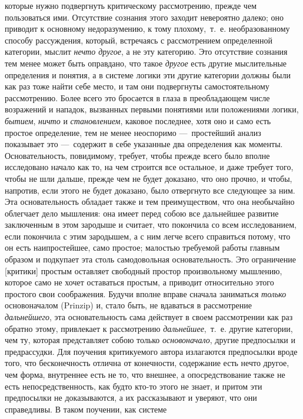 которые нужно подвергнуть критическому рассмотрению, прежде чем
пользоваться ими. Отсутствие сознания этого заходит невероятно далеко; оно
приводит к основному недоразумению, к тому плохому,~т.~е. необразованному
способу рассуждения, который, встречаясь с рассмотрением определенной
категории, мыслит {\em нечто другое}, а не эту
категорию. Это отсутствие сознания тем менее может быть оправдано, что
такое {\em другое} есть другие мыслительные определения
и понятия, а в системе логики эти другие категории должны были как раз тоже
найти себе место, и там они подвергнуты самостоятельному рассмотрению.
Более всего это бросается в глаза в преобладающем числе возражений и
нападок, вызванных первыми понятиями или положениями логики,
{\em бытием}, {\em ничто} и
{\em становлением}, каковое последнее, хотя оно и само
есть простое определение, тем не менее неоспоримо —~простейший анализ
показывает это —~содержит в себе указанные два определения как моменты.
Основательность, повидимому, требует, чтобы прежде всего было вполне
исследовано начало как то, на чем строится все остальное, и даже требует
того, чтобы не шли дальше, прежде чем не будет доказано, что оно прочно, и
чтобы, напротив, если этого не будет доказано, было отвергнуто все
следующее за ним. Эта основательность обладает также и тем преимуществом,
что она необычайно облегчает дело мышления: она имеет перед собою все
дальнейшее развитие заключенным в этом зародыше и считает, что покончила со
всем исследованием, если покончила с этим зародышем, а с ним легче всего
справиться потому, что он есть наипростейшее, само простое; малостью
требуемой работы главным образом и подкупает эта столь самодовольная
основательность. Это ограничение [критики] простым оставляет свободный
простор произвольному мышлению, которое само не хочет оставаться простым, а
приводит относительно этого простого свои соображения. Будучи вполне вправе
сначала заниматься {\em только} основоначалом (Prinzip)
и, стало быть, не вдаваться в рассмотрение
{\em дальнейшего}, эта основательность сама действует в
своем рассмотрении как раз обратно этому, привлекает к рассмотрению
{\em дальнейшее},~т.~е. другие категории, чем ту,
которая представляет собою только {\em основоначало},
другие предпосылки и предрассудки. Для поучения критикуемого автора
излагаются предпосылки вроде того, что бесконечность отлична от конечности,
содержание есть нечто другое, чем форма, внутреннее есть не то, что
внешнее, а опосредствование также не есть непосредственность, как будто
кто-то этого не знает, и притом эти предпосылки не доказываются, а их
рассказывают и уверяют, что они справедливы. В таком поучении, как системе
